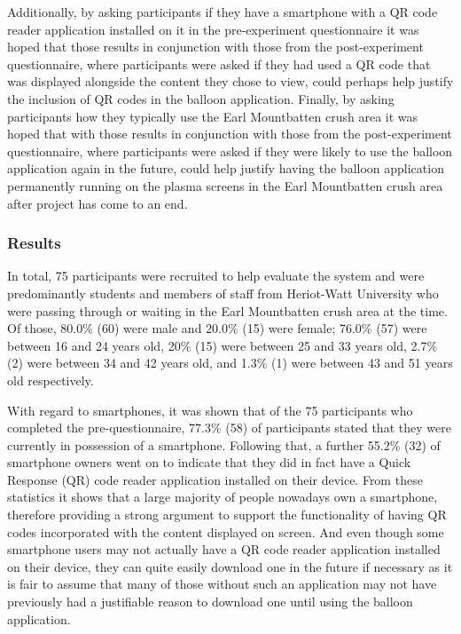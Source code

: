 Additionally, by asking participants if they have a smartphone with a QR code reader application installed on it in the pre-experiment questionnaire it was hoped that those results in conjunction with those from the post-experiment questionnaire, where participants were asked if they had used a QR code that was displayed alongside the content they chose to view, could perhaps help justify the inclusion of QR codes in the balloon application. Finally, by asking participants how they typically use the Earl Mountbatten crush area  it was hoped that with those results in conjunction with those from the post-experiment questionnaire, where participants were asked if they were likely to use the balloon application again in the future, could help justify having the balloon application permanently running on the plasma screens in the Earl Mountbatten crush area after project has come to an end.

\subsubsection{Results}

In total, 75 participants were recruited to help evaluate the system and were predominantly students and members of staff from Heriot-Watt University who were passing through or waiting in the Earl Mountbatten crush area at the time. Of those, 80.0\% (60) were male and 20.0\% (15) were female; 76.0\% (57) were between 16 and 24 years old, 20\% (15) were between 25 and 33 years old, 2.7\% (2) were between 34 and 42 years old, and 1.3\% (1) were between 43 and 51 years old respectively.

With regard to smartphones, it was shown that of the 75 participants who completed the pre-questionnaire, 77.3\% (58) of participants stated that they were currently in possession of a smartphone. Following that, a further 55.2\% (32) of smartphone owners went on to indicate that they did in fact have a Quick Response (QR) code reader application installed on their device. From these statistics it shows that a large majority of people nowadays own a smartphone, therefore providing a strong argument to support the functionality of having QR codes incorporated with the content displayed on screen. And even though some smartphone users may not actually have a QR code reader application installed on their device, they can quite easily download one in the future if necessary as it is fair to assume that many of those without such an application may not have previously had a justifiable reason to download one until using the balloon application.

